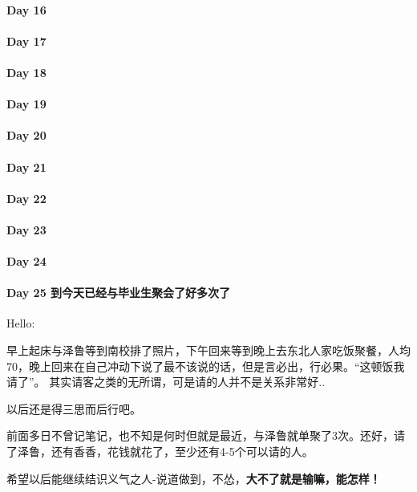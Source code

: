 \documentclass[UTF8,a4paper,8pt]{ctexart}
\begin{document}
 	 \paragraph{Day 16      \quad     }
 	 \paragraph{Day 17      \quad     }
 	 \paragraph{Day 18      \quad     }
 	 \paragraph{Day 19      \quad     }
 	 \paragraph{Day 20      \quad     }
 	 \paragraph{Day 21      \quad     }
 	 \paragraph{Day 22      \quad     }
 	 \paragraph{Day 23      \quad     }
 	 \paragraph{Day 24      \quad     }
 	 \paragraph{Day 25   到今天已经与毕业生聚会了好多次了   \quad     }
	 	 Hello:
	 	 
	 	 早上起床与泽鲁等到南校排了照片，下午回来等到晚上去东北人家吃饭聚餐，人均70，晚上回来在自己冲动下说了最不该说的话，但是言必出，行必果。“这顿饭我请了”。  其实请客之类的无所谓，可是请的人并不是关系非常好..
	 	 
	 	 以后还是得三思而后行吧。
	 	 
	 	 前面多日不曾记笔记，也不知是何时但就是最近，与泽鲁就单聚了3次。还好，请了泽鲁，还有香香，花钱就花了，至少还有4-5个可以请的人。
	 	 
	 	 希望以后能继续结识义气之人-说道做到，不怂，\textbf{大不了就是输嘛，能怎样！}
\end{document}
